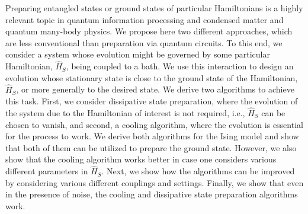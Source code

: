 \documentclass[aps,pra,twocolumn,superscriptaddress,nolongbibliography,nobalancelastpage,10pt]{revtex4-2}
\begin{document}
Preparing entangled states or ground states of particular Hamiltonians is a highly relevant topic in quantum information processing and condensed matter and quantum many-body physics. We propose here two different approaches, which are less conventional than preparation via quantum circuits. To this end, we consider a system whose evolution might be governed by some particular Hamiltonian, $\hat{H}_S$, being coupled to a bath. We use this interaction to design an evolution whose stationary state is close to the ground state of the Hamiltonian, $\hat{H}_S$, or more generally to the desired state. We derive two algorithms to achieve this task. First, we consider dissipative state preparation, where the evolution of the system due to the Hamiltonian of interest is not required, i.e., $\hat{H}_S$ can be chosen to vanish, and second, a cooling algorithm, where the evolution is essential for the process to work. We derive both algorithms for the Ising model and show that both of them can be utilized to prepare the ground state. However, we also show that the cooling algorithm works better in case one considers various different parameters in $\hat{H}_S$. Next, we show how the algorithms can be improved by considering various different couplings and settings. Finally, we show that even in the presence of noise, the cooling and dissipative state preparation algorithms work.
\end{document}
